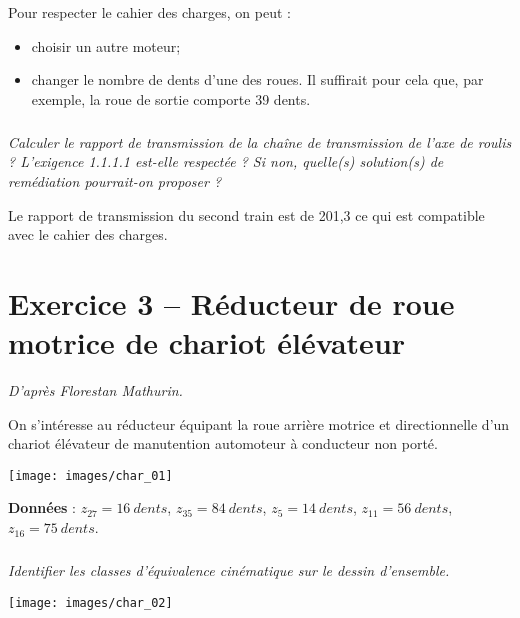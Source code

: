 \documentclass[10pt,fleqn]{article} %
\begin{document}
\begin{multicols}{2}
\begin{multicols}{2}
\begin{corrige}
Pour respecter le cahier des charges, on peut :
\begin{itemize}
\item choisir un autre moteur;
\item changer le nombre de dents d'une des roues. Il suffirait pour cela que,  par exemple, la roue de sortie comporte 39 dents. 
\end{itemize}
\end{corrige}
\else
\fi

\subparagraph{}
\textit{Calculer le rapport de transmission de la chaîne de transmission de l'axe de roulis ? L'exigence 1.1.1.1 est-elle respectée ? Si non, quelle(s) solution(s) de remédiation pourrait-on proposer ?}
\ifprof
\begin{corrige}
Le rapport de transmission du second train est de 201,3 ce qui est compatible avec le cahier des charges.
\end{corrige}
\else
\fi


\section*{Exercice 3 -- Réducteur de roue motrice de chariot élévateur}
\textit{D'après Florestan Mathurin.}
\setcounter{exo}{0}

\ifprof
\else

On s’intéresse au réducteur équipant la roue arrière motrice et directionnelle d’un chariot élévateur de manutention automoteur à conducteur non porté. 



\begin{center}
\texttt{[image: images/char\_01]}
\end{center}


\textbf{Données }: $z_{27} = \SI{16}{dents}$, $z_{35} = \SI{84}{dents}$, $z_{5} = \SI{14}{dents}$, $z_{11} = \SI{56}{dents}$, $z_{16} = \SI{75}{dents}$. 

\fi

\subparagraph{}
\textit{Identifier les classes d’équivalence cinématique sur le dessin d’ensemble. }
\ifprof
\begin{corrige}

\end{corrige}
\else
\fi

\begin{center}
\texttt{[image: images/char\_02]}
\end{center}



\end{multicols}
\end{multicols}
\end{document}
